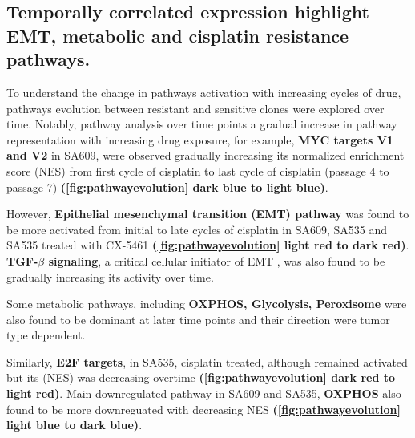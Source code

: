 

\subsection{Temporally correlated expression highlight EMT, metabolic and cisplatin resistance pathways.}
 To understand the change in pathways activation with increasing cycles of drug, pathways evolution between resistant and sensitive clones were explored over time. Notably, pathway analysis over time points a gradual increase in pathway representation with increasing drug exposure, for example, \textbf{MYC targets V1 and V2} in SA609, were observed gradually increasing its normalized enrichment score (NES) from first cycle of cisplatin to last cycle of cisplatin (passage 4 to passage 7) \textbf{(\autoref{fig:pathwayevolution} dark blue to light blue)}. 
 
 However, \textbf{Epithelial mesenchymal transition (EMT) pathway} was found to be more activated from initial to late cycles of cisplatin in SA609, SA535 and SA535 treated with CX-5461 \textbf{(\autoref{fig:pathwayevolution} light red to dark red)}. \textbf{TGF-$\beta$ signaling}, a critical cellular initiator of EMT \cite{wellner2009emt}, was also found to be gradually increasing its activity over time. 

Some metabolic pathways, including \textbf{OXPHOS, Glycolysis, Peroxisome} were also found to be dominant at later time points and their direction were tumor type dependent.
 
 Similarly, \textbf{E2F targets}, in SA535, cisplatin treated, although remained activated but its (NES) was decreasing overtime \textbf{(\autoref{fig:pathwayevolution} dark red to light red)}. Main downregulated pathway in SA609 and SA535, \textbf{OXPHOS} also found to be more downreguated with decreasing NES \textbf{(\autoref{fig:pathwayevolution} light blue to dark blue)}.
 

